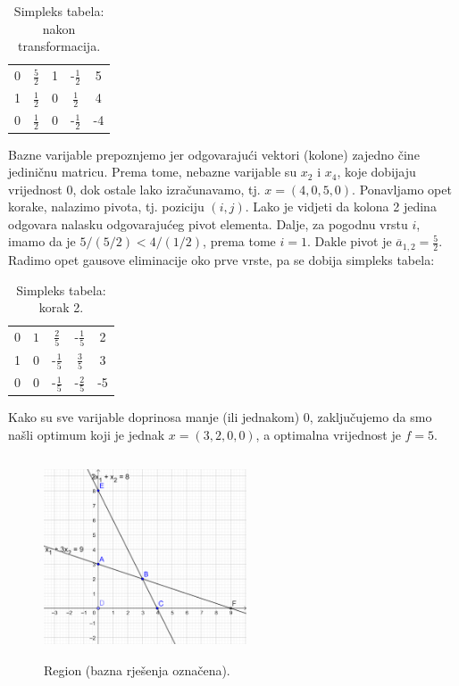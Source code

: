 \documentclass[a4paper, utf8, 11pt, colorlinks]{article}
\begin{document}
  \begin{table}[!ht]
     \centering
     \begin{tabular}{c c c c | c}
         0 &  $\frac{5}{2}$  & 1 & -$\frac{1}{2} $& 5 \\
         1 &  $\frac{1}{2}$ & 0 & $\frac{1}{2}$ & 4 \\ \hline
         0 &  $\frac{1}{2}$ & 0 & -$\frac{1}{2}$ & -4 \\ \hline
     \end{tabular}
     \caption{Simpleks tabela: nakon transformacija.}
     \label{tab:simpleks_tabela2}
 \end{table}
Bazne varijable prepoznjemo jer odgovarajući vektori (kolone) zajedno čine jediničnu matricu. Prema tome, 
 nebazne varijable su $x_2$ i $x_4$, koje dobijaju vrijednost 0, dok ostale lako izračunavamo, tj. $ x = (4, 0, 5, 0)$. Ponavljamo opet korake, nalazimo pivota, tj. poziciju  $(i,j)$. Lako je vidjeti da kolona 2 jedina odgovara nalasku odgovarajućeg pivot elementa. Dalje, za pogodnu vrstu $i$, imamo da je $5 / (5/2) < 4 / (1/2)$, prema tome $i =1$. Dakle pivot je 
 $\overline{a}_{1,2} = \frac{5}{2}$. Radimo opet gausove eliminacije oko prve vrste, pa se dobija simpleks tabela:
 
   \begin{table}[!ht]
     \centering
     \begin{tabular}{c c c c | c}
         0 &  $1$  & $\frac{2}{5}$             &  -$\frac{1}{5} $ & 2 \\
         1 &  0    &      -$\frac{1}{5}$    & $\frac{3}{5}$    & 3 \\ \hline
         0 &  0    &   -$\frac{1}{5}$       &   -$\frac{2}{5}$   & -5 \\ \hline
     \end{tabular}
     \caption{Simpleks tabela: korak 2.}
     \label{tab:simpleks_tabela2}
 \end{table}
 Kako su sve varijable doprinosa manje (ili jednakom) 0, zaključujemo da smo našli optimum koji je jednak $x = (3, 2, 0, 0)$, a optimalna vrijednost je $f = 5$.
 
 \begin{figure}[!ht]
     \centering
     \includegraphics[width=170pt, height=170pt]{simpleks-region-2.eps}
     \caption{Region (bazna rješenja označena).}
     \label{fig:simplex_region} 
 \end{figure}
 
\end{document}

